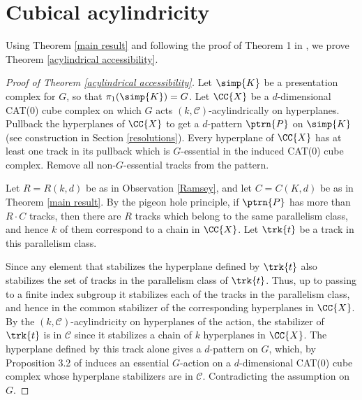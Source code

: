 
\section{Cubical acylindricity}






Using Theorem \ref{main result} and following the proof of Theorem 1 in \cite{Del99}, we prove Theorem \ref{acylindrical accessibility}.

\begin{proof}[Proof of Theorem \ref{acylindrical accessibility}]
	Let $\simp{K}$ be a presentation complex for $G$, so that $\pi_1 (\simp{K})=G$.
	Let $\CC{X}$ be a $d$-dimensional CAT(0) cube complex on which $G$ acts $(k,\mathcal{C})$-acylindrically on hyperplanes. 
	Pullback the hyperplanes of $\CC{X}$ to get a $d$-pattern $\ptrn{P}$ on $\simp{K}$ (see construction in Section \ref{resolutions}).
	Every hyperplane of $\CC{X}$ has at least one track in its pullback which is $G$-essential in the induced CAT(0) cube complex.
	Remove all non-$G$-essential tracks from the pattern.
	
	Let $R=R(k,d)$ be as in Observation \ref{Ramsey}, and let $C=C(K,d)$ be as in Theorem \ref{main result}.
	By the pigeon hole principle, if $\ptrn{P}$ has more than $R\cdot C$ tracks, then there are $R$ tracks which belong to the same parallelism class, and hence $k$ of them correspond to a chain in $\CC{X}$. 
	Let $\trk{t}$ be a track in this parallelism class.
	
	Since any element that stabilizes the hyperplane defined by $\trk{t}$ also stabilizes the set of tracks in the parallelism class of $\trk{t}$. 
	Thus, up to passing to a finite index subgroup it stabilizes each of the tracks in the parallelism class, and hence in the common stabilizer of the corresponding hyperplanes in $\CC{X}$.
	By the $(k,\mathcal{C})$-acylindricity on hyperplanes of the action, the stabilizer of $\trk{t}$ is in $\mathcal {C}$ since it stabilizes a chain of $k$ hyperplanes in $\CC{X}$. 
	The hyperplane defined by this track alone gives a $d$-pattern on $G$, which, by Proposition 3.2 of \cite{CaSa11} induces an essential $G$-action on a $d$-dimensional CAT(0) cube complex whose hyperplane stabilizers are in $\mathcal {C}$.
	Contradicting the assumption on $G$.
\end{proof}


